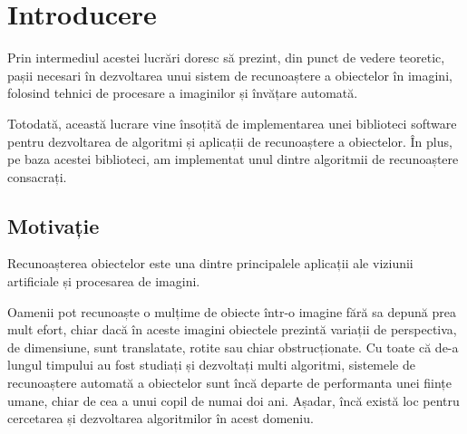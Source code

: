\chapter{Introducere}


Prin intermediul acestei lucrări doresc să prezint, din punct de vedere teoretic, pașii necesari în dezvoltarea unui sistem de recunoaștere a obiectelor în imagini, folosind tehnici de procesare a imaginilor și învățare automată.

Totodată, această lucrare vine însoțită de implementarea unei biblioteci software pentru dezvoltarea de algoritmi și aplicații de recunoaștere a obiectelor.
În plus, pe baza acestei biblioteci, am implementat unul dintre algoritmii de recunoaștere consacrați.



\section{Motivație}

Recunoașterea obiectelor este una dintre principalele aplicații ale viziunii artificiale și procesarea de imagini. 

Oamenii pot recunoaște o mulțime de obiecte într-o imagine fără sa depună prea mult efort, chiar dacă în aceste imagini obiectele prezintă variații de perspectiva, de dimensiune, sunt translatate, rotite sau chiar obstrucționate. 
Cu toate că de-a lungul timpului au fost studiați și dezvoltați multi algoritmi, sistemele de recunoaștere automată a obiectelor sunt încă departe de performanta unei ființe umane, chiar de cea a unui copil de numai doi ani.
Așadar, încă există loc pentru cercetarea și dezvoltarea algoritmilor în acest domeniu.


